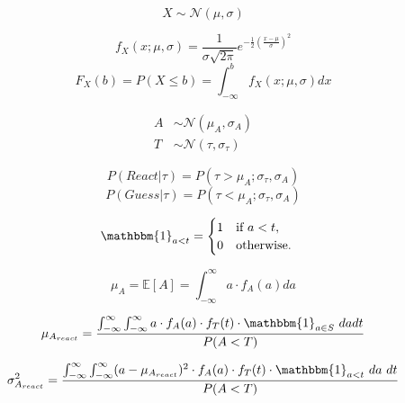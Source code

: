 \documentclass[12pt,letterpaper]{article}
\begin{document}
\begin{equation}
    X\sim\mathcal{N}(\mu,\sigma)
\end{equation}

\begin{equation}
    f_{X}(x; \mu, \sigma) = \frac{1}{\sigma\sqrt{2\pi}}e^{-\frac{1}{2}(\frac{x-\mu}{\sigma})^2}
\end{equation}
\begin{equation}
    F_{X}(b) = P(X \leq b) = \int_{-\infty}^{b} f_{X}(x; \mu, \sigma)dx
\end{equation}



\begin{align}
    A & \sim\mathcal{N}(\mu_{A},\sigma_{A}) \\
    T & \sim\mathcal{N}(\tau,\sigma_{\tau})
\end{align}

\begin{equation}
    P(React|\tau) = P(\tau>\mu_{A}; \sigma_{\tau}, \sigma_{A})
\end{equation}
\begin{equation}
    P(Guess|\tau) = P(\tau<\mu_{A}; \sigma_{\tau}, \sigma_{A})
\end{equation}

\begin{align}
     & \mathbbm{1}_{a<t} =
    \begin{cases}
        1 & \text{if } a <t,  \\
        0 & \text{otherwise.}
    \end{cases}
\end{align}

\begin{equation}
    \mu_{A} = \mathbb{E}[A] = \int_{-\infty}^{\infty}a \cdot f_{A}(a)da
\end{equation}


\begin{equation}
    \mu_{A_{react}} = \dfrac{\int_{-\infty}^{\infty}  \int_{-\infty}^{\infty} a \cdot f_{A}(a) \cdot f_{T}(t) \cdot \mathbbm{1}_{a \in S} \ dadt} {P(A<T)}
\end{equation}

\begin{equation}
    \sigma^2_{A_{react}} = \dfrac{\int_{-\infty}^{\infty}  \int_{-\infty}^{\infty} (a - \mu_{A_{react}})^2 \cdot f_{A}(a) \cdot f_{T}(t) \cdot \mathbbm{1}_{a<t} \ da \ dt}{P(A<T)}
\end{equation}
\end{document}

